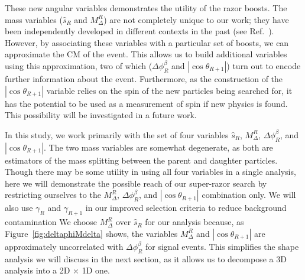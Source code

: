 These new angular variables demonstrates the utility of the razor boosts. The mass variables ($\hat{s}_R$ and $M_\Delta^R$) are not completely unique to our work; they have been independently developed in different contexts in the past (see Ref.~\cite{Rainwater:1999sd}). However, by associating these variables with a particular set of boosts, we can approximate the CM of the event. This allows us to build additional variables using this approximation, two of which ($\Delta \phi_R^{\beta}$ and $|\cos\theta_{R+1}|$) turn out to encode further information about the event. Furthermore, as the construction of the $|\cos\theta_{R+1}|$ variable relies on the spin of the new particles being searched for, it has the potential to be used as a measurement of spin if new physics is found. This possibility will be investigated in a future work. 

In this study, we work primarily with the set of four variables $\hat{s}_R$, $M_\Delta^R$, $\Delta \phi_R^{\beta}$, and $|\cos\theta_{R+1}|$. The two mass variables are somewhat degenerate, as both are estimators of the mass splitting between the parent and daughter particles. Though there may be some utility in using all four variables in a single analysis, here we will demonstrate the possible reach of our super-razor search by restricting ourselves to the $M_\Delta^R$, $\Delta \phi_R^{\beta}$, and $|\cos\theta_{R+1}|$ combination only. We will also use $\gamma_{R}$ and $\gamma_{R+1}$ in our improved selection criteria to reduce background contamination  We choose $M_\Delta^R$ over $\hat{s}_R$ for our analysis because, as Figure~\ref{fig:deltaphiMdelta} shows, the variables $M_\Delta^R$ and $|\cos\theta_{R+1}|$ are approximately uncorrelated with $\Delta\phi_R^\beta$ for signal events. This simplifies the shape analysis we will discuss in the next section, as it allows us to decompose a 3D analysis into a 2D $\times$ 1D one.

